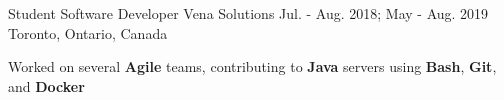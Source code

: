 \begin{cventries}
{\begin{cvitems}
      \end{cvitems}
    }

  \cventry
    {Student Software Developer} %
    {Vena Solutions} %
    {Jul. - Aug. 2018; May - Aug. 2019} %
    {Toronto, Ontario, Canada} %
    {
      \begin{cvitems} %
        \item{Worked on several \textbf{Agile} teams, contributing to \textbf{Java} servers using \textbf{Bash}, \textbf{Git}, and \textbf{Docker}}
      \end{cvitems}
    }



\end{cventries}
